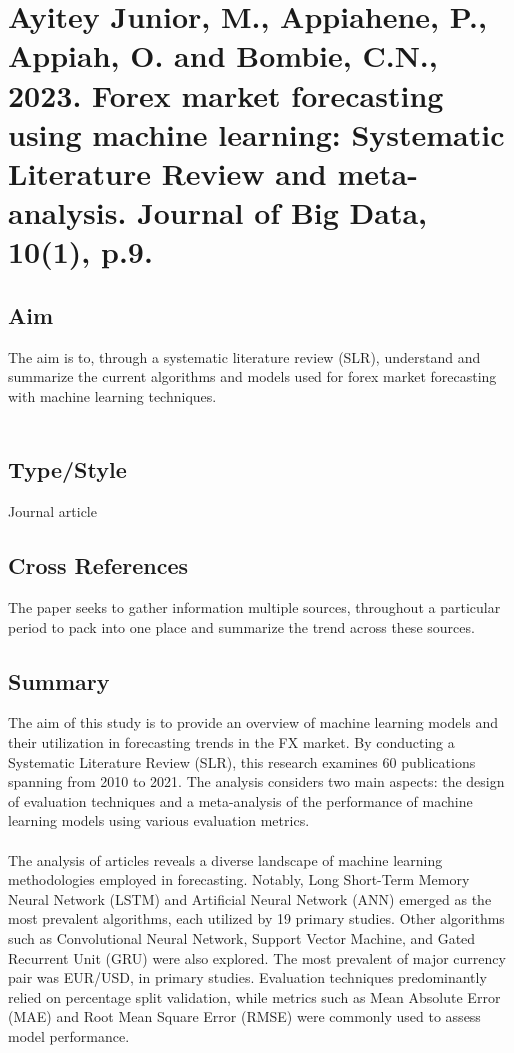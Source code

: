 \documentclass{article}
\begin{document}
\section{Ayitey Junior, M., Appiahene, P., Appiah, O. and Bombie, C.N., 2023. Forex market forecasting using machine learning: Systematic Literature Review and meta-analysis. Journal of Big Data, 10(1), p.9.}
    \subsection*{Aim}
    
    The aim is to, through a systematic literature review (SLR), understand and summarize the current algorithms and models used for forex market forecasting with machine learning techniques.\\\\
    
    \subsection{Type/Style}
    Journal article
    \subsection{Cross References}
    The paper seeks to gather information multiple sources, throughout a particular period to pack into one place and summarize the trend across these sources.
    \subsection{Summary}
    The aim of this study is to provide an overview of machine learning models and their utilization in forecasting trends in the FX market. By conducting a Systematic Literature Review (SLR), this research examines 60 publications spanning from 2010 to 2021. The analysis considers two main aspects: the design of evaluation techniques and a meta-analysis of the performance of machine learning models using various evaluation metrics.\\\\
    
    The analysis of articles reveals a diverse landscape of machine learning methodologies employed in forecasting. Notably, Long Short-Term Memory Neural Network (LSTM) and Artificial Neural Network (ANN) emerged as the most prevalent algorithms, each utilized by 19 primary studies. Other algorithms such as Convolutional Neural Network, Support Vector Machine, and Gated Recurrent Unit (GRU) were also explored. The most prevalent of major currency pair was EUR/USD, in primary studies. Evaluation techniques predominantly relied on percentage split validation, while metrics such as Mean Absolute Error (MAE) and Root Mean Square Error (RMSE) were commonly used to assess model performance. 
    
    
\end{document}

